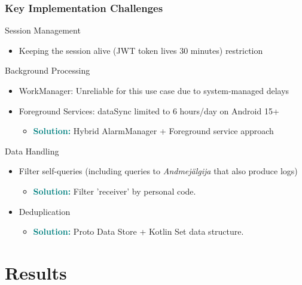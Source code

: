 \documentclass[aspectratio=169,11pt]{beamer}
\begin{document}
\begin{frame}
\frametitle{Key Implementation Challenges}
\begin{block}{Session Management}
\begin{itemize}
    \item Keeping the session alive (JWT token lives 30 minutes)
restriction
\end{itemize}
\end{block}

\begin{block}{Background Processing}
\begin{itemize}
    \item WorkManager: Unreliable for this use case due to system-managed delays
    \item Foreground Services: dataSync limited to 6 hours/day on Android 15+
    \begin{itemize}
        \item \textcolor{teal}{\textbf{Solution:}} Hybrid AlarmManager + Foreground service approach
    \end{itemize}
\end{itemize}
\end{block}

\begin{block}{Data Handling}
\begin{itemize}
    \item Filter self-queries (including queries to \textit{Andmejälgija} that also produce logs)
    \begin{itemize}
        \item \textcolor{teal}{\textbf{Solution:}} Filter 'receiver' by personal code.
    \end{itemize}
    \item Deduplication
    \begin{itemize}
        \item \textcolor{teal}{\textbf{Solution:}} Proto Data Store + Kotlin Set data structure.
    \end{itemize}
\end{itemize}
\end{block}
\end{frame}

\section{Results}
\end{document}
